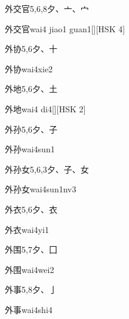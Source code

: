 \begin{entry}{外交官}{5,6,8}{⼣、⼇、⼧}
  \begin{phonetics}{外交官}{wai4 jiao1 guan1}[][HSK 4]
  \end{phonetics}
\end{entry}

\begin{entry}{外协}{5,6}{⼣、⼗}
  \begin{phonetics}{外协}{wai4xie2}
  \end{phonetics}
\end{entry}

\begin{entry}{外地}{5,6}{⼣、⼟}
  \begin{phonetics}{外地}{wai4 di4}[][HSK 2]
  \end{phonetics}
\end{entry}

\begin{entry}{外孙}{5,6}{⼣、⼦}
  \begin{phonetics}{外孙}{wai4sun1}
  \end{phonetics}
\end{entry}

\begin{entry}{外孙女}{5,6,3}{⼣、⼦、⼥}
  \begin{phonetics}{外孙女}{wai4sun1nv3}
  \end{phonetics}
\end{entry}

\begin{entry}{外衣}{5,6}{⼣、⾐}
  \begin{phonetics}{外衣}{wai4yi1}
  \end{phonetics}
\end{entry}

\begin{entry}{外围}{5,7}{⼣、⼞}
  \begin{phonetics}{外围}{wai4wei2}
  \end{phonetics}
\end{entry}

\begin{entry}{外事}{5,8}{⼣、⼅}
  \begin{phonetics}{外事}{wai4shi4}
  \end{phonetics}
\end{entry}

